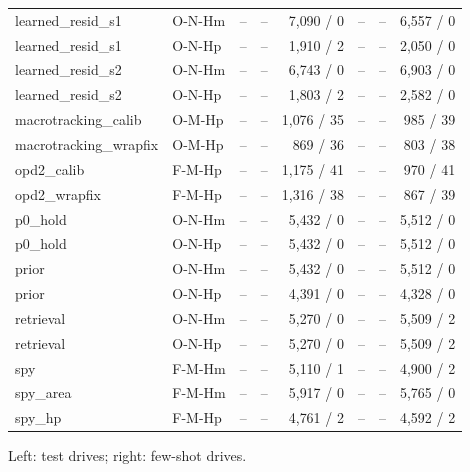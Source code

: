 \begin{table}[t]
\begin{tabular}{llrrrrrr}
learned\_resid\_s1 & O-N-Hm & -- & -- & 7{,}090 / 0 & -- & -- & 6{,}557 / 0 \\
learned\_resid\_s1 & O-N-Hp & -- & -- & 1{,}910 / 2 & -- & -- & 2{,}050 / 0 \\
learned\_resid\_s2 & O-N-Hm & -- & -- & 6{,}743 / 0 & -- & -- & 6{,}903 / 0 \\
learned\_resid\_s2 & O-N-Hp & -- & -- & 1{,}803 / 2 & -- & -- & 2{,}582 / 0 \\
macrotracking\_calib & O-M-Hp & -- & -- & 1{,}076 / 35 & -- & -- & 985 / 39 \\
macrotracking\_wrapfix & O-M-Hp & -- & -- & 869 / 36 & -- & -- & 803 / 38 \\
opd2\_calib & F-M-Hp & -- & -- & 1{,}175 / 41 & -- & -- & 970 / 41 \\
opd2\_wrapfix & F-M-Hp & -- & -- & 1{,}316 / 38 & -- & -- & 867 / 39 \\
p0\_hold & O-N-Hm & -- & -- & 5{,}432 / 0 & -- & -- & 5{,}512 / 0 \\
p0\_hold & O-N-Hp & -- & -- & 5{,}432 / 0 & -- & -- & 5{,}512 / 0 \\
prior & O-N-Hm & -- & -- & 5{,}432 / 0 & -- & -- & 5{,}512 / 0 \\
prior & O-N-Hp & -- & -- & 4{,}391 / 0 & -- & -- & 4{,}328 / 0 \\
retrieval & O-N-Hm & -- & -- & 5{,}270 / 0 & -- & -- & 5{,}509 / 2 \\
retrieval & O-N-Hp & -- & -- & 5{,}270 / 0 & -- & -- & 5{,}509 / 2 \\
spy & F-M-Hm & -- & -- & 5{,}110 / 1 & -- & -- & 4{,}900 / 2 \\
spy\_area & F-M-Hm & -- & -- & 5{,}917 / 0 & -- & -- & 5{,}765 / 0 \\
spy\_hp & F-M-Hp & -- & -- & 4{,}761 / 2 & -- & -- & 4{,}592 / 2 \\
\bottomrule\end{tabular}
\par\smallskip\raggedright Left: test drives; right: few-shot drives.
\end{table}
